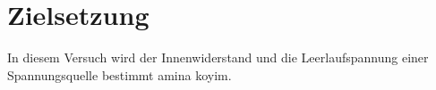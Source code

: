 \setcounter{page}{1}
\section{Zielsetzung}
\label{sec:Zielsetzung}

In diesem Versuch wird der Innenwiderstand und die Leerlaufspannung einer Spannungsquelle bestimmt amina koyim.


